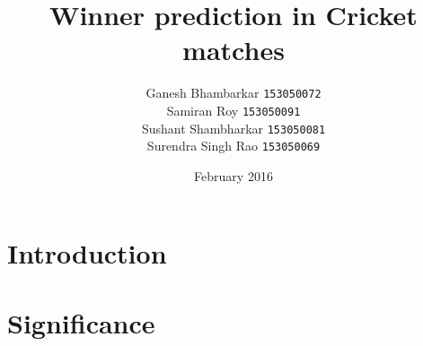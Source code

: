 \documentclass{article}
\title{Winner prediction in Cricket matches}
\author{Ganesh Bhambarkar \texttt{153050072}\\Samiran Roy \texttt{153050091}\\Sushant Shambharkar \texttt{153050081}\\Surendra Singh Rao \texttt{153050069}}
\date{February 2016}
\begin{document}
\maketitle

\section{Introduction}


\section{Significance}



\end{document}
